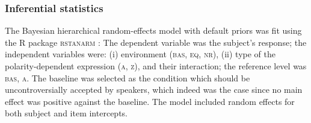 \documentclass[output=paper,colorlinks,citecolor=brown]{langscibook}
\begin{document}
\subsubsection{Inferential statistics}\label{sec:experiment-inf}

The Bayesian hierarchical random-effects model with default priors was fit using the R package \textsc{rstanarm} \citep{rstanarm}: The dependent variable was the subject's response; the independent variables were: (i) environment (\textsc{bas, eq, nr}), (ii) type of the polarity-dependent expression (\textsc{a, z}), and their interaction; the reference level was \textsc{bas, a}. The baseline was selected as the condition which should be uncontroversially accepted by speakers, which indeed was the case since no main effect was positive against the baseline. The model included random effects for both subject and item intercepts.
\end{document}
